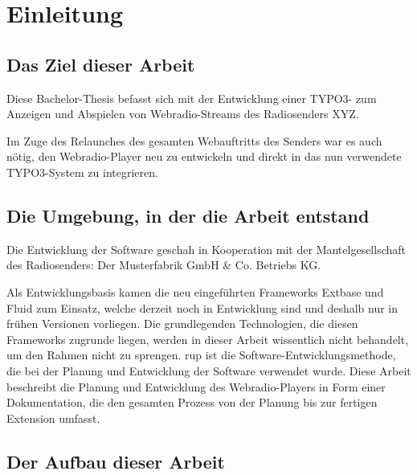 
\chapter{Einleitung}
\label{cha:Einleitung}


\section{Das Ziel dieser Arbeit}
\label{sec:ZielDerArbeit}

Diese Bachelor-Thesis befasst sich mit der Entwicklung einer TYPO3- zum Anzeigen und Abspielen von Webradio-Streams des Radiosenders XYZ.

Im Zuge des Relaunches des gesamten Webauftritts des Senders war es auch n\"otig, den Webradio-Player neu zu entwickeln und direkt in das nun verwendete TYPO3-System zu integrieren.


\section{Die Umgebung, in der die Arbeit entstand}
\label{sec:EntstehungsUmgebungArbeit}

Die Entwicklung der Software geschah in Kooperation mit der Mantelgesellschaft des Radiosenders: Der Musterfabrik GmbH \& Co. Betriebs KG.

Als Entwicklungsbasis kamen die neu eingef\"uhrten Frameworks Extbase und Fluid zum Einsatz, welche derzeit noch in Entwicklung sind und deshalb nur in fr\"uhen Versionen vorliegen. Die grundlegenden Technologien, die diesen Frameworks zugrunde liegen, werden in dieser Arbeit wissentlich nicht behandelt, um den Rahmen nicht zu sprengen. \gls{rup} ist die Software-Entwicklungsmethode, die bei der Planung und Entwicklung der Software verwendet wurde. Diese Arbeit beschreibt die Planung und Entwicklung des Webradio-Players in Form einer Dokumentation, die den gesamten Prozess von der Planung bis zur fertigen Extension umfasst.


\section{Der Aufbau dieser Arbeit}
\label{sec:AufbauDieserArbeit}

